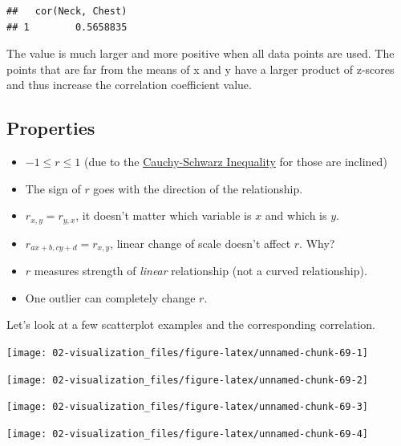 \documentclass[
]{book}
\begin{document}
\begin{verbatim}
##   cor(Neck, Chest)
## 1        0.5658835
\end{verbatim}

The value is much larger and more positive when all data points are used. The points that are far from the means of x and y have a larger product of z-scores and thus increase the correlation coefficient value.

\hypertarget{properties}{%
\subsection{Properties}\label{properties}}

\begin{itemize}
\item
  \(-1 \leq r \leq 1\) (due to the \href{https://en.wikipedia.org/wiki/Cauchy\%E2\%80\%93Schwarz_inequality}{Cauchy-Schwarz Inequality} for those are inclined)
\item
  The sign of \(r\) goes with the direction of the relationship.
\item
  \(r_{x,y} = r_{y,x}\), it doesn't matter which variable is \(x\) and which is \(y\).
\item
  \(r_{ax+b, cy+d} = r_{x,y}\), linear change of scale doesn't affect \(r\). Why?
\item
  \(r\) measures strength of \emph{linear} relationship (not a curved relationship).
\item
  One outlier can completely change \(r\).
\end{itemize}

Let's look at a few scatterplot examples and the corresponding correlation.

\begin{center}\texttt{[image: 02-visualization\_files/figure-latex/unnamed-chunk-69-1]} \end{center}

\begin{center}\texttt{[image: 02-visualization\_files/figure-latex/unnamed-chunk-69-2]} \end{center}

\begin{center}\texttt{[image: 02-visualization\_files/figure-latex/unnamed-chunk-69-3]} \end{center}

\begin{center}\texttt{[image: 02-visualization\_files/figure-latex/unnamed-chunk-69-4]} \end{center}
\end{document}
